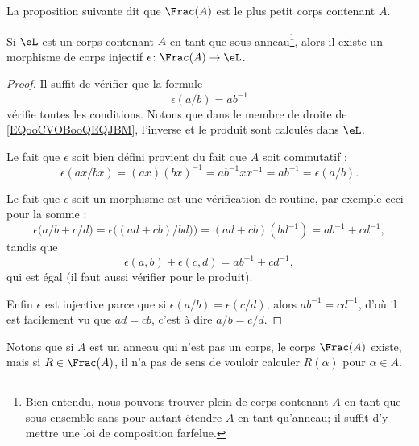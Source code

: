 La proposition suivante dit que \( \Frac(A)\) est le plus petit corps contenant \( A\).

\begin{proposition}      \label{PROPooGSHDooJOnDsp}
    Si \( \eL\) est un corps contenant \( A\) en tant que sous-anneau\footnote{Bien entendu, nous pouvons trouver plein de corps contenant \( A\) en tant que sous-ensemble sans pour autant étendre \( A\) en tant qu'anneau; il suffit d'y mettre une loi de composition farfelue.}, alors il existe un morphisme de corps injectif \( \epsilon\colon \Frac(A)\to \eL\).
\end{proposition}

\begin{proof}
    Il suffit de vérifier que la formule
    \begin{equation}        \label{EQooCVOBooQEQJBM}
        \epsilon(a/b)=ab^{-1}
    \end{equation}
    vérifie toutes les conditions. Notons que dans le membre de droite de \eqref{EQooCVOBooQEQJBM}, l'inverse et le produit sont calculés dans \( \eL\).

    Le fait que \( \epsilon\) soit bien défini provient du fait que \( A\) soit commutatif :
    \begin{equation}
        \epsilon(ax/bx)=(ax)(bx)^{-1}=ab^{-1}xx^{-1}=ab^{-1}=\epsilon(a/b).
    \end{equation}

    Le fait que \( \epsilon\) soit un morphisme est une vérification de routine, par exemple ceci pour la somme :
    \begin{equation}
        \epsilon\big( a/b+c/d \big)=\epsilon\big( (ad+cb)/bd)\big)=(ad+cb)(bd^{-1})=ab^{-1}+cd^{-1},
    \end{equation}
    tandis que
    \begin{equation}
        \epsilon(a,b)+\epsilon(c,d)=ab^{-1}+cd^{-1},
    \end{equation}
    qui est égal (il faut aussi vérifier pour le produit).

    Enfin \( \epsilon\) est injective parce que si \( \epsilon(a/b)=\epsilon(c/d)\), alors \( ab^{-1}=cd^{-1}\), d'où il est facilement vu que \( ad=cb\), c'est à dire \( a/b=c/d\).
\end{proof}

Notons que si \( A\) est un anneau qui n'est pas un corps, le corps \( \Frac(A)\) existe, mais si \( R\in\Frac(A)\), il n'a pas de sens de vouloir calculer \( R(\alpha)\) pour \( \alpha\in A\).

